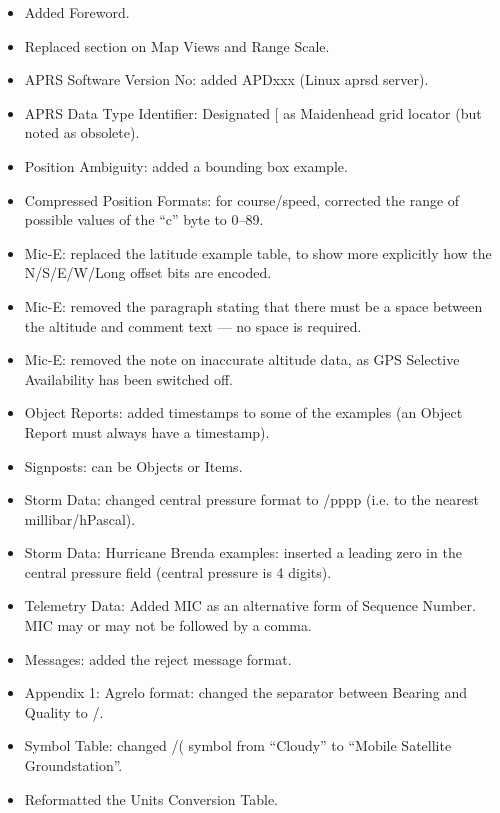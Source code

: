 \begin{itemize}
\item  Added Foreword.
\item  Replaced section on Map Views and Range Scale.
\item  APRS Software Version No: added APDxxx (Linux aprsd server).
\item  APRS Data Type Identifier: Designated [ as Maidenhead grid locator (but noted as obsolete).
\item  Position Ambiguity: added a bounding box example.
\item  Compressed Position Formats: for course/speed, corrected the range of possible values of the
“c” byte to 0–89.
\item  Mic-E: replaced the latitude example table, to show more explicitly how the N/S/E/W/Long
offset bits are encoded.
\item  Mic-E: removed the paragraph stating that there must be a space between the altitude and
comment text — no space is required.
\item  Mic-E: removed the note on inaccurate altitude data, as GPS Selective Availability has been
switched off.
\item  Object Reports: added timestamps to some of the examples (an Object Report must always
have a timestamp).
\item  Signposts: can be Objects or Items.
\item  Storm Data: changed central pressure format to /pppp (i.e. to the nearest millibar/hPascal).
\item  Storm Data: Hurricane Brenda examples: inserted a leading zero in the central pressure field
(central pressure is 4 digits).
\item  Telemetry Data: Added MIC as an alternative form of Sequence Number. MIC may or may
not be followed by a comma.
\item  Messages: added the reject message format.
\item  Appendix 1: Agrelo format: changed the separator between Bearing and Quality to /.
\item  Symbol Table: changed /( symbol from “Cloudy” to “Mobile Satellite Groundstation”.
\item  Reformatted the Units Conversion Table.

\end{itemize}

